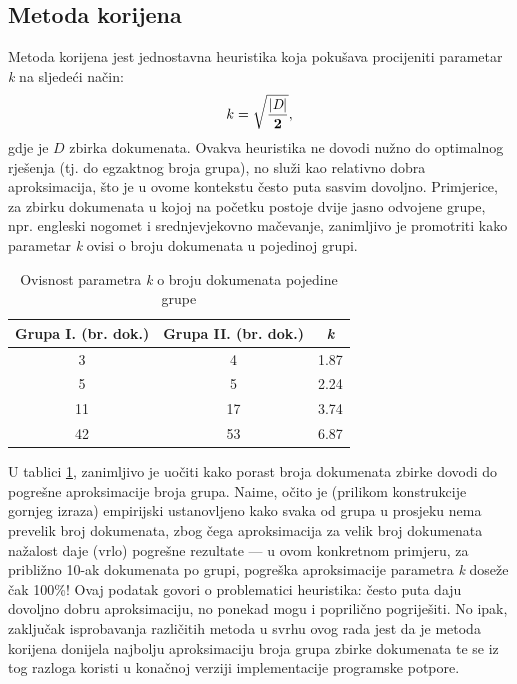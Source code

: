 \documentclass[times, utf8, zavrsni, numeric]{fer}
\begin{document}

%

\subsection{Metoda korijena}
Metoda korijena jest jednostavna heuristika koja pokušava procijeniti parametar \textit{k} na sljedeći način:
\begin{equation}
{k}={\mathbf {\sqrt{|\textit{D}| \over 2}}},
\end{equation}
gdje je $D$ zbirka dokumenata. Ovakva heuristika ne dovodi nužno do optimalnog rješenja (tj. do egzaktnog broja grupa), no služi kao relativno dobra aproksimacija, što je u ovome kontekstu često puta sasvim dovoljno. Primjerice, za zbirku dokumenata u kojoj na početku postoje dvije jasno odvojene grupe, npr. engleski nogomet i srednjevjekovno mačevanje, zanimljivo je promotriti kako parametar \textit{k} ovisi o broju dokumenata u pojedinoj grupi.

\begin{table}
\begin{center}
\begin{tabular}{|c|c|c|}
\hline
Grupa I. (br. dok.) & Grupa II. (br. dok.) & \textit{k} \\
\hline
3 & 4 & 1.87 \\
5 & 5 & 2.24 \\
11 & 17 & 3.74 \\
42 & 53 & 6.87 \\
\hline
\end{tabular}
\end{center}
\caption{Ovisnost parametra \textit{k} o broju dokumenata pojedine grupe}
\label{table:kmeans}
\end{table}

U tablici \ref{table:kmeans}, zanimljivo je uočiti kako porast broja dokumenata zbirke dovodi do pogrešne aproksimacije broja grupa. Naime, očito je (prilikom konstrukcije gornjeg izraza) empirijski ustanovljeno kako svaka od grupa u prosjeku nema prevelik broj dokumenata, zbog čega aproksimacija za velik broj dokumenata nažalost daje (vrlo) pogrešne rezultate — u ovom konkretnom primjeru, za približno 10-ak dokumenata po grupi, pogreška aproksimacije parametra \textit{k} doseže čak 100\%! Ovaj podatak govori o problematici heuristika: često puta daju dovoljno dobru aproksimaciju, no ponekad mogu i poprilično pogriješiti.
No ipak, zaključak isprobavanja različitih metoda u svrhu ovog rada jest da je metoda korijena donijela najbolju aproksimaciju broja grupa zbirke dokumenata te se iz tog razloga koristi u konačnoj verziji implementacije programske potpore.
\end{document}

